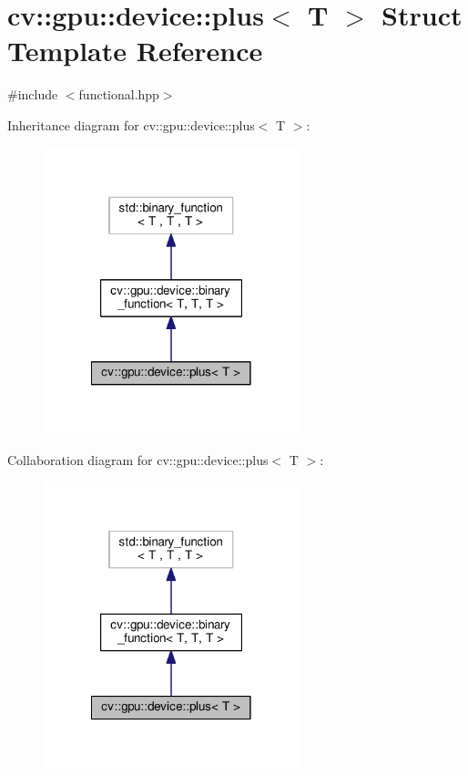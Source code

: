 \hypertarget{structcv_1_1gpu_1_1device_1_1plus}{\section{cv\-:\-:gpu\-:\-:device\-:\-:plus$<$ T $>$ Struct Template Reference}
\label{structcv_1_1gpu_1_1device_1_1plus}
}


{\ttfamily \#include $<$functional.\-hpp$>$}



Inheritance diagram for cv\-:\-:gpu\-:\-:device\-:\-:plus$<$ T $>$\-:\nopagebreak
\begin{figure}[H]
\begin{center}
\leavevmode
\includegraphics[width=210pt]{structcv_1_1gpu_1_1device_1_1plus__inherit__graph}
\end{center}
\end{figure}


Collaboration diagram for cv\-:\-:gpu\-:\-:device\-:\-:plus$<$ T $>$\-:\nopagebreak
\begin{figure}[H]
\begin{center}
\leavevmode
\includegraphics[width=210pt]{structcv_1_1gpu_1_1device_1_1plus__coll__graph}
\end{center}
\end{figure}
